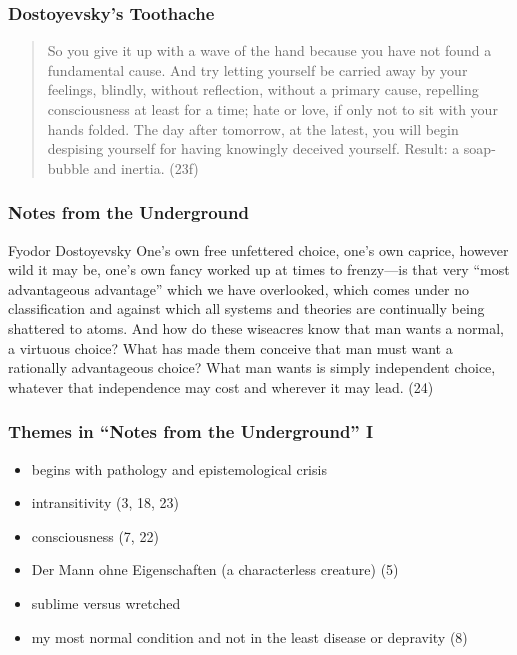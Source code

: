 \documentclass[xcolor=dvipsnames]{beamer}
\begin{document}
\begin{frame}
  \frametitle{Dostoyevsky's Toothache}
  \begin{quote}
    So you give it up with a wave of the hand because you have not
    found a fundamental cause. And try letting yourself be carried
    away by your feelings, blindly, without reflection, without a
    primary cause, repelling consciousness at least for a time;
    hate or love, if only not to sit with your hands folded. The
    day after tomorrow, at the latest, you will begin despising
    yourself for having knowingly deceived yourself. Result: a
    soap-bubble and inertia. (23f)
  \end{quote}
\end{frame}

\begin{frame}
  \frametitle{Notes from the Underground}
  \begin{block}{Fyodor Dostoyevsky}
    One's own free unfettered choice, one's own caprice, however wild
    it may be, one's own fancy worked up at times to frenzy---is that
    very ``most advantageous advantage'' which we have overlooked, which
    comes under no classification and against which all systems and
    theories are continually being shattered to atoms. And how do
    these wiseacres know that man wants a normal, a virtuous choice?
    What has made them conceive that man must want a rationally
    advantageous choice? What man wants is simply independent choice,
    whatever that independence may cost and wherever it may lead. (24)
  \end{block}
\end{frame}

\begin{frame}
  \frametitle{Themes in ``Notes from the Underground'' I}
  \begin{itemize}
  \item begins with pathology and epistemological crisis
  \item intransitivity (3, 18, 23)
  \item consciousness (7, 22)
  \item Der Mann ohne Eigenschaften (a characterless creature) (5)
  \item sublime versus wretched
  \item my most normal condition and not in the least disease or
    depravity (8)
  \end{itemize}
\end{frame}
\end{document}
